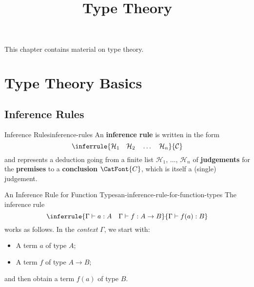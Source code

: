 

%



\title{Type Theory}

\maketitle

\label{section-phantom}

This chapter contains material on type theory.

\ChapterTableOfContents

\section{Type Theory Basics}\label{section-type-theory-basics}
\subsection{Inference Rules}\label{subsection-inference-rules}
\begin{definition}{Inference Rules}{inference-rules}%
    An \textbf{inference rule} is written in the form
    \[
        \inferrule{\mathcal{H}_{1}\quad\mathcal{H}_{2}\quad\ldots\quad\mathcal{H}_{n}}{\mathcal{C}}%
    \]%
    and represents a deduction going from a finite list $\mathcal{H}_{1}$, $\ldots$, $\mathcal{H}_{n}$ of \textbf{judgements} for the \textbf{premises} to a \textbf{conclusion} $\CatFont{C}$, which is itself a (single) judgement.
\end{definition}
\begin{example}{An Inference Rule for Function Types}{an-inference-rule-for-function-types}%
    The inference rule
    \[
        \inferrule{\Gamma\vdash a:A\quad\Gamma\vdash f:A\to B}{\Gamma\vdash f(a):B}%
    \]%
    works as follows. In the \emph{context} $\Gamma$, we start with:
    \begin{itemize}
        \item A term $a$ of type $A$;
        \item A term $f$ of type $A\to B$;
    \end{itemize}
    and then obtain a term $f(a)$ of type $B$.
\end{example}
